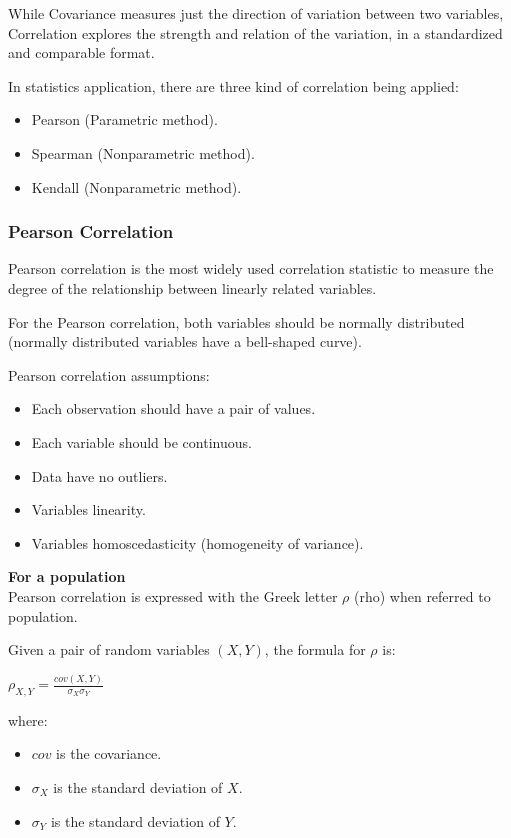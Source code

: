 \documentclass{article}
\begin{document}
While Covariance measures just the direction of variation between two variables, Correlation explores the strength and relation of the variation, in a standardized and comparable format.

In statistics application, there are three kind of correlation being applied:

\begin{itemize}
    \item Pearson (Parametric method).
    \item Spearman (Nonparametric method).
    \item Kendall (Nonparametric method).
\end{itemize}

\subsubsection{Pearson Correlation}
Pearson correlation is the most widely used correlation statistic to measure the degree of the relationship between linearly related variables. 

For the Pearson correlation, both variables should be normally distributed (normally distributed variables have a bell-shaped curve). 

Pearson correlation assumptions:
\begin{itemize}
    \item Each observation should have a pair of values.
    \item Each variable should be continuous.
    \item Data have no outliers.
    \item Variables linearity.
    \item Variables homoscedasticity (homogeneity of variance).
\end{itemize}

\textbf{For a population}\\
Pearson correlation is expressed with the Greek letter $\rho$ (rho) when referred to population.

Given a pair of random variables $(X,Y)$, the formula for $\rho$ is:

$\displaystyle \rho _{X,Y}={\frac{cov(X,Y)}{\sigma _{X}\sigma _{Y}}}$

where:
\begin{itemize}
    \item $\displaystyle {cov}$ is the covariance.
    \item $\displaystyle \sigma _{X}$ is the standard deviation of $X$.
    \item $\displaystyle \sigma _{Y}$  is the standard deviation of $Y$.
\end{itemize}
\end{document}
